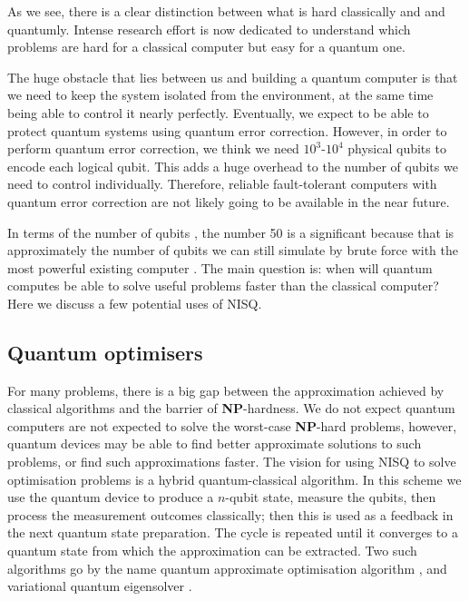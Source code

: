 As we see, there is a clear distinction between what is hard classically and and quantumly. Intense research effort is now dedicated to understand which problems are hard for a classical computer but easy for a quantum one.

The huge obstacle that lies between us and building a quantum computer is that we need to keep the system isolated from the environment, at the same time being able to control it nearly perfectly. Eventually, we expect to be able to protect quantum systems using quantum error correction. However, in order to perform quantum error correction, we think we need $10^3$-$10^4$ physical qubits to encode each logical qubit. This adds a huge overhead to the number of qubits we need to control individually. Therefore, reliable fault-tolerant computers with quantum error correction are not likely going to be available in the near future.

In terms of the number of qubits , the number 50 is a significant because that is approximately the number of qubits we can still simulate by brute force with the most powerful existing computer \cite{bib:boixo2018characterizing}. The main question is: when will quantum computes be able to solve useful problems faster than the classical computer? Here we discuss a few potential uses of NISQ.

\subsection{Quantum optimisers}

For many problems, there is a big gap between the approximation achieved by classical algorithms and the barrier of \textbf{NP}-hardness. We do not expect quantum computers are not expected to solve the worst-case \textbf{NP}-hard problems, however, quantum devices may be able to find better approximate solutions to such problems, or find such approximations faster. The vision for using NISQ to solve optimisation problems is a hybrid quantum-classical algorithm. In this scheme we use the quantum device to produce a $n$-qubit state, measure the qubits, then process the measurement outcomes classically; then this is used as a feedback in the next quantum state preparation. The cycle is repeated until it converges to a quantum state from which the approximation can be extracted. Two such algorithms go by the name quantum approximate optimisation algorithm \cite{bib:farhi2014quantum}, and variational quantum eigensolver \cite{bib:mcclean2016theory}.

